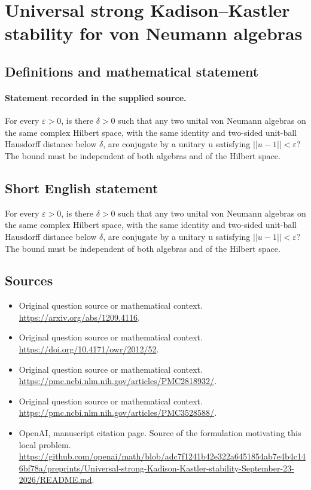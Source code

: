 \documentclass[11pt]{article}
\begin{document}
\section*{Universal strong Kadison–Kastler stability for von Neumann algebras}\label{30007317}
\subsection{Definitions and mathematical statement}
\paragraph{Statement recorded in the supplied source.}
For every $\varepsilon >0$, is there $\delta >0$ such that any two unital von Neumann algebras on the same complex Hilbert space, with the same identity and two-sided unit-ball Hausdorff distance below $\delta $, are conjugate by a unitary u satisfying $||u-1||<\varepsilon $? The bound must be independent of both algebras and of the Hilbert space.
\subsection{Short English statement}
For every $\varepsilon >0$, is there $\delta >0$ such that any two unital von Neumann algebras on the same complex Hilbert space, with the same identity and two-sided unit-ball Hausdorff distance below $\delta $, are conjugate by a unitary u satisfying $||u-1||<\varepsilon $? The bound must be independent of both algebras and of the Hilbert space.
\subsection{Sources}
\begin{itemize}
\item[S1] Original question source or mathematical context.
\url{https://arxiv.org/abs/1209.4116}.
\item[S2] Original question source or mathematical context.
\url{https://doi.org/10.4171/owr/2012/52}.
\item[S3] Original question source or mathematical context.
\url{https://pmc.ncbi.nlm.nih.gov/articles/PMC2818932/}.
\item[S4] Original question source or mathematical context.
\url{https://pmc.ncbi.nlm.nih.gov/articles/PMC3528588/}.
\item[S5] OpenAI, manuscript citation page. Source of the formulation motivating this local problem.
\url{https://github.com/openai/math/blob/adc7f1241b42e322a6451854ab7e4b4c146bf78a/preprints/Universal-strong-Kadison-Kastler-stability-September-23-2026/README.md}.
\end{itemize}
\end{document}
